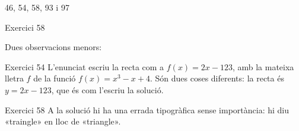 
%
        {46, 54, 58, 93 i 97}

\begin{errada}{Exercici 58}
\end{errada}


\ifobs
\bigskip
\noindent
Dues observacions menors:\par\nopagebreak

\begin{observacio}{Exercici 54}
  L'enunciat escriu la recta com a $f(x)=2x-123$, amb la mateixa lletra $f$
  de la funció $f(x)=x^3-x+4$. Són dues coses diferents: la recta és
  $y=2x-123$, que és com l'escriu la solució.
\end{observacio}

\begin{observacio}{Exercici 58}
  A la solució hi ha una errada tipogràfica sense importància: hi diu
  «traingle» en lloc de «triangle».
\end{observacio}
\fi
